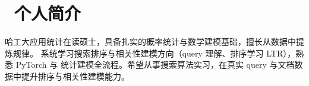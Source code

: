 \section{\faUser\ 个人简介}
哈工大应用统计在读硕士，具备扎实的概率统计与数学建模基础，擅长从数据中提炼规律。
系统学习搜索排序与相关性建模方向（query 理解、排序学习 LTR），熟悉 PyTorch 与
统计建模全流程。希望从事搜索算法实习，在真实 query 与文档数据中提升排序与相关性建模能力。
